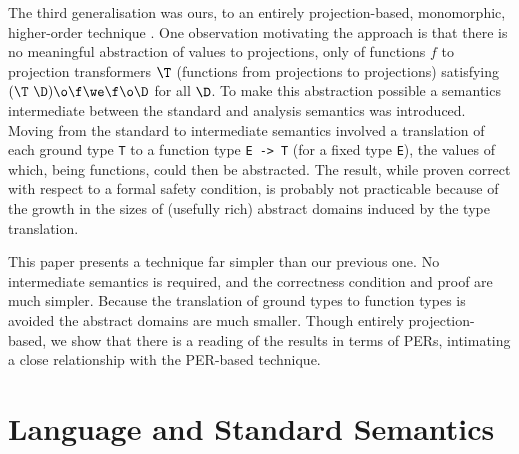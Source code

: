 \documentclass[11pt]{article}
\begin{document}
The third generalisation was ours, to an entirely projection-based,
monomorphic, higher-order technique \cite{Dav93b}.  One observation
motivating the approach is that there is no meaningful abstraction of
values to projections, only of functions $f$ to projection
transformers $\T$ (functions from projections to projections)
satisfying $(\T~\D)\o\f\we\f\o\D$ for all $\D$.  To make this
abstraction possible a semantics intermediate between the standard and
analysis semantics was introduced.  Moving from the standard to
intermediate semantics involved a translation of each ground type \mbox{\tt T}
to a function type \mbox{\tt E}\ \mbox{\tt ->}\ \mbox{\tt T} (for a fixed type \mbox{\tt E}), the values
of which, being functions, could then be abstracted.  The result,
while proven correct with respect to a formal safety condition, is
probably not practicable because of the growth in the sizes of
(usefully rich) abstract domains induced by the type translation.

This paper presents a technique far simpler than our
previous one.  No intermediate semantics is required, and the
correctness condition and proof are much simpler.  Because the
translation of ground types to function types is avoided the abstract
domains are much smaller. Though entirely projection-based, we show
that there is a reading of the results in terms of PERs, intimating a
close relationship with the PER-based technique.

\section{Language and Standard Semantics}
\end{document}
